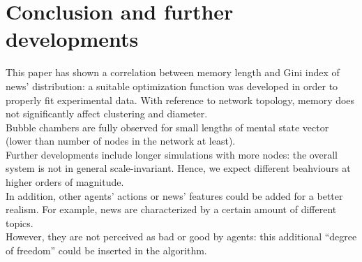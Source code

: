 \section{Conclusion and further developments}
This paper has shown a correlation between memory length and Gini index of news' distribution: 
a suitable optimization function was developed in order to properly fit experimental data.
With reference to network topology, memory does not significantly affect clustering and diameter.\\
Bubble chambers are fully observed for small lengths of mental state vector (lower than number of nodes
in the network at least).\\
Further developments include longer simulations with more nodes:  the overall system is not in general 
scale-invariant. Hence, we expect different beahviours at higher orders of magnitude.\\
In addition, other agents' actions or news' features could be added for a better realism.
For example, news are characterized by a certain amount of different topics.\\
However, they are not perceived as bad or good by agents: this additional ``degree of freedom'' 
could be inserted in the algorithm.





